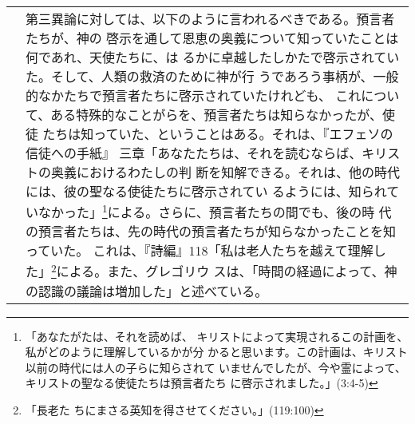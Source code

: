 \documentclass[10pt]{jsarticle} %
\begin{document}
\begin{longtable}{p{21em}p{21em}}
&

第三異論に対しては、以下のように言われるべきである。預言者たちが、神の
啓示を通して恩恵の奥義について知っていたことは何であれ、天使たちに、は
るかに卓越したしかたで啓示されていた。そして、人類の救済のために神が行
うであろう事柄が、一般的なかたちで預言者たちに啓示されていたけれども、
これについて、ある特殊的なことがらを、預言者たちは知らなかったが、使徒
たちは知っていた、ということはある。それは、『エフェソの信徒への手紙』
三章「あなたたちは、それを読むならば、キリストの奥義におけるわたしの判
断を知解できる。それは、他の時代には、彼の聖なる使徒たちに啓示されてい
るようには、知られていなかった」\footnote{「あなたがたは、それを読めば、
キリストによって実現されるこの計画を、私がどのように理解しているかが分
かると思います。この計画は、キリスト以前の時代には人の子らに知らされて
いませんでしたが、今や霊によって、キリストの聖なる使徒たちは預言者たち
に啓示されました。」(3:4-5)}による。さらに、預言者たちの間でも、後の時
代の預言者たちは、先の時代の預言者たちが知らなかったことを知っていた。
これは、『詩編』118「私は老人たちを越えて理解した」\footnote{「長老た
ちにまさる英知を得させてください。」(119:100)}による。また、グレゴリウ
スは、「時間の経過によって、神の認識の議論は増加した」と述べている。

\end{longtable}
\end{document}
